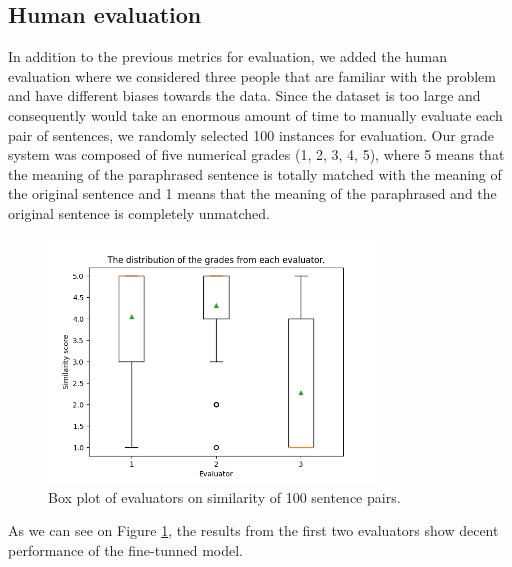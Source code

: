 \documentclass[fleqn,moreauthors,10pt]{ds_report}
\begin{document}



\subsection*{Human evaluation}
In addition to the previous metrics for evaluation, we added the human evaluation where we considered three people that are familiar with the problem and have different biases towards the data. Since the dataset is too large and consequently would take an enormous amount of time to manually evaluate each pair of sentences, we randomly selected 100 instances for evaluation. Our grade system was composed of five numerical grades (1, 2, 3, 4, 5), where 5 means that the meaning of the paraphrased sentence is totally matched with the meaning of the original sentence and 1 means that the meaning of the paraphrased and the original sentence is completely unmatched.

\begin{figure}[!hbt]
    \centering
    \includegraphics[width=\linewidth, height=6.5cm]{fig/fig.png}
    \caption{Box plot of evaluators on similarity of 100 sentence pairs.}
    \label{fig:eval_res}
\end{figure}
As we can see on Figure \ref{fig:eval_res}, the results from the first two evaluators show decent performance of the fine-tunned model.
\end{document}
